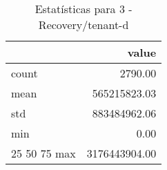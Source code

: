 \begin{table}[htbp]
\caption{Estatísticas para 3 - Recovery/tenant-d}
\label{tab:3_-_recovery_tenant-d_summary}
\begin{tabular}{lr}
\toprule
 & value \\
\midrule
count & 2790.00 \\
mean & 565215823.03 \\
std & 883484962.06 \\
min & 0.00 \\
25%
50%
75%
max & 3176443904.00 \\
\bottomrule
\end{tabular}
\end{table}
